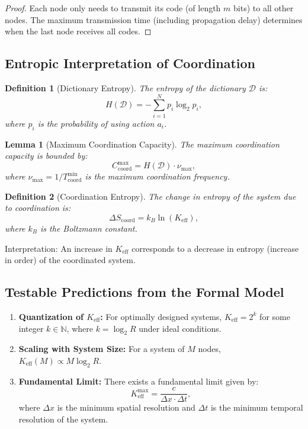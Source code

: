 \documentclass[12pt]{article}
\newtheorem{definition}{Definition}
\newtheorem{lemma}{Lemma}
\begin{document}
	\begin{proof}
		Each node only needs to transmit its code (of length $m$ bits) to all other nodes. The maximum transmission time (including propagation delay) determines when the last node receives all codes.
	\end{proof}
	
	\subsection{Entropic Interpretation of Coordination}
	\label{app:entropy}
	
	\begin{definition}[Dictionary Entropy]
		The entropy of the dictionary $\mathcal{D}$ is:
		\[
		H(\mathcal{D}) = - \sum_{i=1}^{N} p_i \log_2 p_i,
		\]
		where $p_i$ is the probability of using action $a_i$.
	\end{definition}
	
	\begin{lemma}[Maximum Coordination Capacity]
		The maximum coordination capacity is bounded by:
		\[
		C_{\text{coord}}^{\text{max}} = H(\mathcal{D}) \cdot \nu_{\text{max}},
		\]
		where $\nu_{\text{max}} = 1 / T_{\text{coord}}^{\text{min}}$ is the maximum coordination frequency.
	\end{lemma}
	
	\begin{definition}[Coordination Entropy]
		The change in entropy of the system due to coordination is:
		\[
		\Delta S_{\text{coord}} = k_B \ln(K_{\mathrm{eff}}),
		\]
		where $k_B$ is the Boltzmann constant.
	\end{definition}
	
	Interpretation: An increase in $K_{\mathrm{eff}}$ corresponds to a decrease in entropy (increase in order) of the coordinated system.
	
	\subsection{Testable Predictions from the Formal Model}
	\label{app:predictions}
	
	\begin{enumerate}
		\item \textbf{Quantization of $K_{\mathrm{eff}}$:} For optimally designed systems, $K_{\mathrm{eff}} = 2^k$ for some integer $k \in \mathbb{N}$, where $k = \log_2 R$ under ideal conditions.
		
		\item \textbf{Scaling with System Size:} For a system of $M$ nodes, $K_{\mathrm{eff}}(M) \propto M \log_2 R$.
		
		\item \textbf{Fundamental Limit:} There exists a fundamental limit given by:
		\[
		K_{\mathrm{eff}}^{\text{max}} = \frac{c}{\Delta x \cdot \Delta t},
		\]
		where $\Delta x$ is the minimum spatial resolution and $\Delta t$ is the minimum temporal resolution of the system.
	\end{enumerate}
	
\end{document}
